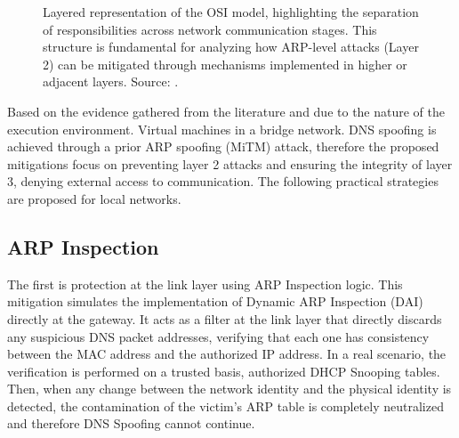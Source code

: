 \documentclass[conference]{IEEEtran}
\begin{document}
\begin{figure}[H]
    \caption{Layered representation of the OSI model, highlighting the separation of responsibilities across network communication stages. This structure is fundamental for analyzing how ARP-level attacks (Layer 2) can be mitigated through mechanisms implemented in higher or adjacent layers. Source: \cite{XX}.}
\end{figure}


Based on the evidence gathered from the literature and due to the nature of the execution environment. Virtual machines in a bridge network. DNS spoofing is achieved through a prior ARP spoofing (MiTM) attack, therefore the proposed mitigations focus on preventing layer 2 attacks and ensuring the integrity of layer 3, denying external access to communication. The following practical strategies are proposed for local networks.

\subsection{ARP Inspection}
The first is protection at the link layer using ARP Inspection logic. This mitigation simulates the implementation of Dynamic ARP Inspection (DAI) directly at the gateway. It acts as a filter at the link layer that directly discards any suspicious DNS packet addresses, verifying that each one has consistency between the MAC address and the authorized IP address. In a real scenario, the verification is performed on a trusted basis, authorized DHCP Snooping tables. Then, when any change between the network identity and the physical identity is detected, the contamination of the victim's ARP table is completely neutralized and therefore DNS Spoofing cannot continue.
\end{document}
